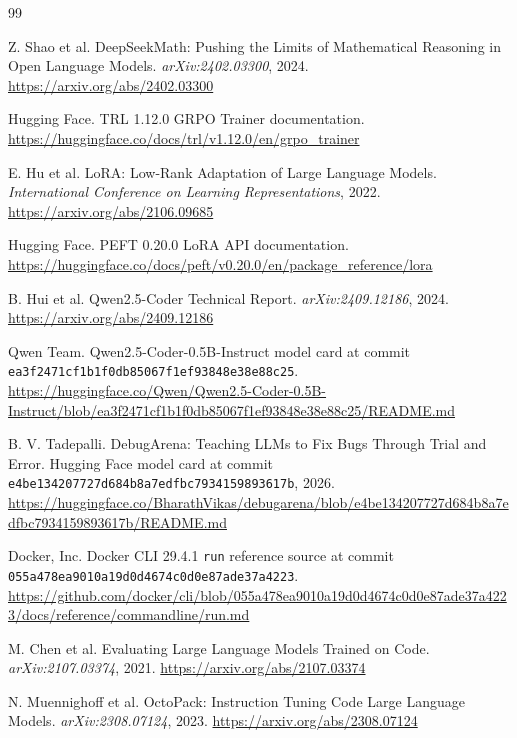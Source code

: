 \documentclass[11pt]{article}
\begin{document}
{\raggedright
\begin{thebibliography}{99}

Z. Shao et al.
\newblock DeepSeekMath: Pushing the Limits of Mathematical Reasoning in Open Language Models.
\newblock \emph{arXiv:2402.03300}, 2024.
\newblock \url{https://arxiv.org/abs/2402.03300}

Hugging Face.
\newblock TRL 1.12.0 GRPO Trainer documentation.
\newblock \url{https://huggingface.co/docs/trl/v1.12.0/en/grpo_trainer}

E. Hu et al.
\newblock LoRA: Low-Rank Adaptation of Large Language Models.
\newblock \emph{International Conference on Learning Representations}, 2022.
\newblock \url{https://arxiv.org/abs/2106.09685}

Hugging Face.
\newblock PEFT 0.20.0 LoRA API documentation.
\newblock \url{https://huggingface.co/docs/peft/v0.20.0/en/package_reference/lora}

B. Hui et al.
\newblock Qwen2.5-Coder Technical Report.
\newblock \emph{arXiv:2409.12186}, 2024.
\newblock \url{https://arxiv.org/abs/2409.12186}

Qwen Team.
\newblock Qwen2.5-Coder-0.5B-Instruct model card at commit
\texttt{ea3f2471cf1b1f0db85067f1ef93848e38e88c25}.
\newblock \url{https://huggingface.co/Qwen/Qwen2.5-Coder-0.5B-Instruct/blob/ea3f2471cf1b1f0db85067f1ef93848e38e88c25/README.md}

B. V. Tadepalli.
\newblock DebugArena: Teaching LLMs to Fix Bugs Through Trial and Error.
\newblock Hugging Face model card at commit
\texttt{e4be134207727d684b8a7edfbc7934159893617b}, 2026.
\newblock \url{https://huggingface.co/BharathVikas/debugarena/blob/e4be134207727d684b8a7edfbc7934159893617b/README.md}

Docker, Inc.
\newblock Docker CLI 29.4.1 \texttt{run} reference source at commit
\texttt{055a478ea9010a19d0d4674c0d0e87ade37a4223}.
\newblock \url{https://github.com/docker/cli/blob/055a478ea9010a19d0d4674c0d0e87ade37a4223/docs/reference/commandline/run.md}

M. Chen et al.
\newblock Evaluating Large Language Models Trained on Code.
\newblock \emph{arXiv:2107.03374}, 2021.
\newblock \url{https://arxiv.org/abs/2107.03374}

N. Muennighoff et al.
\newblock OctoPack: Instruction Tuning Code Large Language Models.
\newblock \emph{arXiv:2308.07124}, 2023.
\newblock \url{https://arxiv.org/abs/2308.07124}


\end{thebibliography}}
\end{document}
